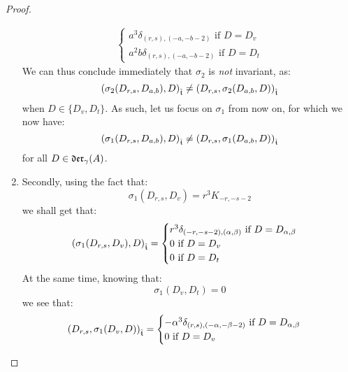 \begin{proof}
\begin{enumerate}
$$\begin{aligned}
\begin{cases}
                                    \text{$a^3 \delta_{(r, s), (-a, -b - 2)}$ if $D = D_v$}
                                    \\
                                    \text{$a^2 b \delta_{(r, s), (-a, -b - 2)}$ if $D = D_t$}
                                \end{cases}
                            \end{aligned}
                        $$
                    We can thus conclude immediately that $\sigma_2$ is \textit{not} invariant, as:
                        $$\left( \sigma_2(D_{r, s}, D_{a, b}), D \right)_{\extendedtoroidal} \not = \left( D_{r, s}, \sigma_2(D_{a, b}, D) \right)_{\extendedtoroidal}$$
                    when $D \in \{D_v, D_t\}$. As such, let us focus on $\sigma_1$ from now on, for which we now have:
                        $$\left( \sigma_1(D_{r, s}, D_{a, b}), D \right)_{\extendedtoroidal} \not = \left( D_{r, s}, \sigma_1(D_{a, b}, D) \right)_{\extendedtoroidal}$$
                    for all $D \in \divzero$.
                    \item Secondly, using the fact that:
                        $$\sigma_1(D_{r, s}, D_v) = r^3 K_{-r, -s - 2}$$
                    we shall get that:
                        $$
                            \left( \sigma_1(D_{r, s}, D_v), D \right)_{\extendedtoroidal} =
                            \begin{cases}
                                \text{$r^3 \delta_{(-r, -s - 2), (\alpha, \beta)}$ if $D = D_{\alpha, \beta}$}
                                \\
                                \text{$0$ if $D = D_v$}
                                \\
                                \text{$0$ if $D = D_t$}
                            \end{cases}
                        $$
                    At the same time, knowing that:
                        $$\sigma_1(D_v, D_t) = 0$$
                    we see that:
                        $$
                            \begin{aligned}
                                \left( D_{r, s}, \sigma_1(D_v, D) \right)_{\extendedtoroidal} =
                                \begin{cases}
                                    \text{$-\alpha^3 \delta_{(r, s), (-\alpha, -\beta - 2)}$ if $D = D_{\alpha, \beta}$}
                                    \\
                                    \text{$0$ if $D = D_v$}

\end{cases}
\end{aligned}$$
\end{enumerate}
\end{proof}
